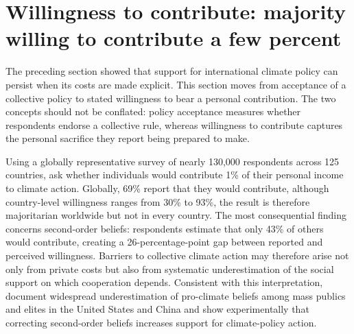 \section{Willingness to contribute: majority willing to contribute a few percent}

The preceding section showed that support for international climate policy can persist when its costs are made explicit. This section moves from acceptance of a collective policy to stated willingness to bear a personal contribution. The two concepts should not be conflated: policy acceptance measures whether respondents endorse a collective rule, whereas willingness to contribute captures the personal sacrifice they report being prepared to make. 

Using a globally representative survey of nearly 130,000 respondents across 125 countries, \citet{andre_globally_2024} ask whether individuals would contribute 1\% of their personal income to climate action. Globally, 69\% report that they would contribute, although country-level willingness ranges from 30\% to 93\%, the result is therefore majoritarian worldwide but not in every country. %
The most consequential finding concerns second-order beliefs: respondents estimate that only 43\% of others would contribute, creating a 26-percentage-point gap between reported and perceived willingness. Barriers to collective climate action may therefore arise not only from private costs but also from systematic underestimation of the social support on which cooperation depends. Consistent with this interpretation, \citet{mildenberger_beliefs_2017} document widespread underestimation of pro-climate beliefs among mass publics and elites in the United States and China and show experimentally that correcting second-order beliefs increases support for climate-policy action.

